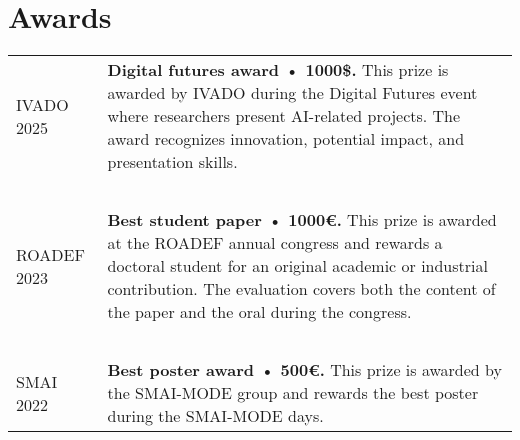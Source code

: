\section{Awards}

\begin{longtable}[l]{@{}p{}p{}}
    IVADO 2025 & \textbf{Digital futures award •  1000\$.} This prize is awarded by IVADO during the Digital Futures event where researchers present AI-related projects. The award recognizes innovation, potential impact, and presentation skills. \\~\\
    ROADEF 2023 & \textbf{Best student paper • 1000€.} This prize is awarded at the ROADEF annual congress and rewards a doctoral student for an original academic or industrial contribution. The evaluation covers both the content of the paper and the oral during the congress. \\~\\
    SMAI 2022 & \textbf{Best poster award • 500€.} This prize is awarded by the SMAI-MODE group and rewards the best poster during the SMAI-MODE days. \\
\end{longtable}